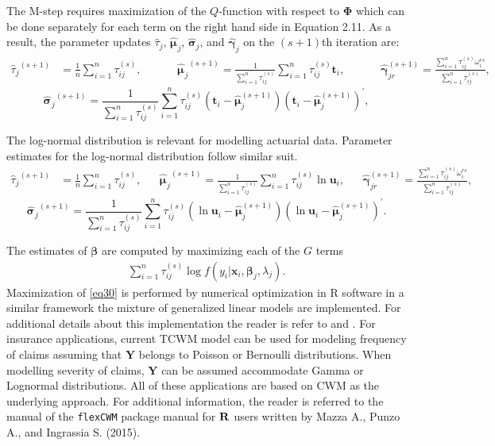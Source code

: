 \documentclass[11pt,letterpaper]{article}
\numberwithin{equation}{section}
\numberwithin{equation}{section}
\numberwithin{equation}{section}
\begin{document}
The M-step requires maximization of the $Q$-function with respect to $\bm \Phi$ which can be done separately for each term on the right hand side in Equation 2.11. %
As a result, the parameter updates $\hat{\tau}_j$, $\hat{\bm \mu^{}}_j$, $\hat{\bm \sigma}_j$, and $\hat{\bm \gamma}_j$ on the $(s+1)$th iteration are:
\begin{align*}
{\hat{\tau}_j}^{(s+1)}&=\frac{1}{n} \sum_{i=1}^n \tau_{ij}^{(s)}, && && {\hat{\bm \mu^{}}_j}^{(s+1)}=\frac{1}{\sum_{i=1}^n \tau_{ij}^{(s)}} \sum_{i=1}^n \tau_{ij}^{(s)}\bm t_i, &&  && {\hat{\bm \gamma}^{(s+1)}_{jr}} =\frac{\sum_{i=1}^n \tau_{ij}^{(s)} \omega^{rs}_i} {\sum_{i=1}^n \tau_{ij}^{(s)}}, 
\end{align*}
$$
 {\hat{\bm \sigma^{}}_j}^{(s+1)}=\frac{1}{\sum_{i=1}^n \tau_{ij}^{(s)}} \sum_{i=1}^n \tau_{ij}^{(s)}(\bm t_i-\hat{\bm \mu}^{(s+1)}_j) (\bm t_i-\hat{\bm \mu}^{(s+1)}_j)^{'}  ,
$$

The log-normal distribution is relevant for modelling actuarial data.  Parameter estimates for the log-normal distribution follow similar suit.
\begin{align*}
{\hat{\tau}_j}^{(s+1)}&=\frac{1}{n} \sum_{i=1}^n \tau_{ij}^{(s)},&&
{\hat{\bm \mu^{}}_j}^{(s+1)}=\frac{1}{\sum_{i=1}^n \tau_{ij}^{(s)}} \sum_{i=1}^n \tau_{ij}^{(s)}\ln \bm u_i,&&
{\hat{\bm \gamma}^{(s+1)}_{jr}}=\frac{\sum_{i=1}^n \tau_{ij}^{(s)} \omega^{rs}_i} {\sum_{i=1}^n \tau_{ij}^{(s)}},
\end{align*}
$$ {\hat{\bm \sigma^{}}_j}^{(s+1)}=\frac{1}{\sum_{i=1}^n \tau_{ij}^{(s)}} \sum_{i=1}^n \tau_{ij}^{(s)}(\ln \bm u_i-\hat{\bm \mu}^{(s+1)}_j) (\ln \bm u_i-\hat{\bm \mu}^{(s+1)}_j)^{'}. $$

The estimates of $\bm\beta$ are computed by maximizing each of the $G$ terms
\begin{align}
\sum_{i=1}^{n}\tau^{(s)}_{ij} \log{f}(y_i|\bm x_i,\bm \beta_j,\lambda_j).
\label{eq30}
\end{align}
Maximization of \eqref{eq30} is performed by numerical optimization in R software in a similar framework the mixture of generalized linear models are implemented. For additional details about this implementation the reader is refer to \cite{Wedel+DeSabro:1995} and \cite{Wedel:2002}.
For insurance applications, current TCWM model can be used for modeling frequency of claims assuming that $\bm{Y}$ belongs to Poisson or Bernoulli distributions. When modelling severity of claims, $\bm{Y}$ can be assumed accommodate Gamma or Lognormal distributions. All of these applications are based on CWM as the underlying approach. For additional information, the reader is referred to the manual of the {\tt flexCWM} package manual for ${\bf R}$ users written by Mazza A., Punzo A., and Ingrassia S. (2015).%
\end{document}

